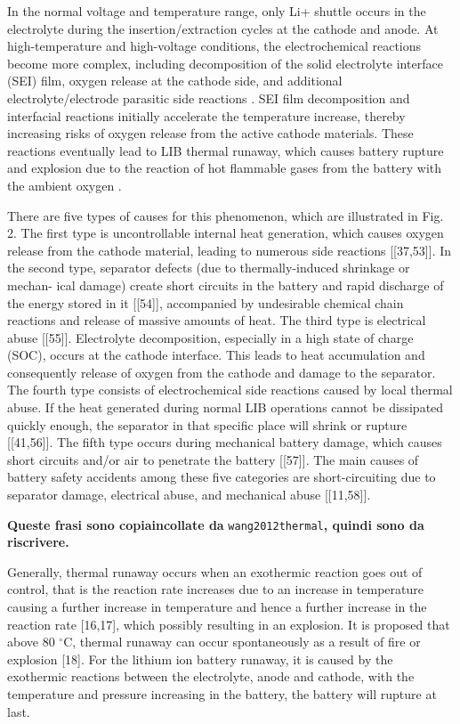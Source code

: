 In the normal voltage and temperature range, only Li+ shuttle occurs in the electrolyte during the insertion/extraction cycles at the cathode and anode. At high-temperature and high-voltage conditions, the electrochemical reactions become more complex, including decomposition of the solid electrolyte interface (SEI) film, oxygen release at the cathode side, and additional electrolyte/electrode parasitic side reactions \cite{maleki1999thermal}. SEI film decomposition and interfacial reactions initially accelerate the temperature increase, thereby increasing risks of oxygen release from the active cathode materials. These reactions eventually lead to LIB thermal runaway, which causes battery rupture and explosion due to the reaction of hot flammable gases from the battery with the ambient oxygen \cite{finegan2016investigating}.

There are five types of causes for this phenomenon, which are illustrated in Fig. 2. The first type is uncontrollable internal heat generation, which causes oxygen release from the cathode material, leading to numerous side reactions [[37,53]]. In the second type, separator defects (due to thermally-induced shrinkage or mechan- ical damage) create short circuits in the battery and rapid discharge of the energy stored in it [[54]], accompanied by undesirable chemical chain reactions and release of massive amounts of heat. The third type is electrical abuse [[55]]. Electrolyte decomposition, especially in a high state of charge (SOC), occurs at the cathode interface. This leads to heat accumulation and consequently release of oxygen from the cathode and damage to the separator. The fourth type consists of electrochemical side reactions caused by local thermal abuse. If the heat generated during normal LIB operations cannot be dissipated quickly enough, the separator in that specific place will shrink or rupture [[41,56]]. The fifth type occurs during mechanical battery damage, which causes short circuits and/or air to penetrate the battery [[57]]. The main causes of battery safety accidents among these five categories are short-circuiting due to separator damage, electrical abuse, and mechanical abuse [[11,58]].

\textbf{Queste frasi sono copiaincollate da} \texttt{wang2012thermal}\textbf{, quindi sono da riscrivere.}

Generally, thermal runaway occurs when an exothermic reaction goes out of control, that is the reaction rate increases due to an increase in temperature causing a further increase in temperature and hence a further increase in the reaction rate [16,17], which possibly resulting in an explosion. It is proposed that above 80 $^\circ$C, thermal runaway can occur spontaneously as a result of fire or explosion [18]. For the lithium ion battery runaway, it is caused by the exothermic reactions between the electrolyte, anode and cathode, with the temperature and pressure increasing in the battery, the battery will rupture at last.

